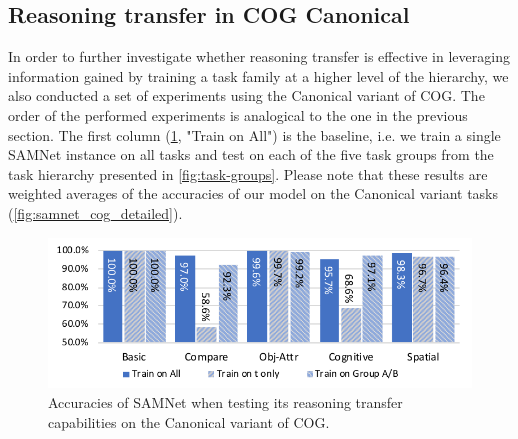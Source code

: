 



\subsection{Reasoning transfer in COG Canonical}
\label{sec:reasoning-transfer-cog}
In order to further investigate whether reasoning transfer is effective in leveraging information gained by training a task family at a higher level of the hierarchy, we also conducted a set of experiments using the Canonical variant of COG.
The order of the performed experiments is analogical to the one in the previous section.
The first column (\cref{fig:cog_reasoning_transfer}, "Train on All") is the baseline, i.e.
we train a single SAMNet instance on all tasks and test on each of the five task groups from the task hierarchy presented in \cref{fig:task-groups}.
Please note that these results are weighted averages of the accuracies of our model on the Canonical variant tasks (\cref{fig:samnet_cog_detailed}).

\begin{figure}[htbp]
	\centering
	\includegraphics[width=\columnwidth]{../img/plots/cog_reasoning_transfer.pdf}
	\caption{Accuracies of SAMNet when testing its reasoning transfer capabilities on the Canonical variant of COG.}
	\label{fig:cog_reasoning_transfer}
\end{figure}

